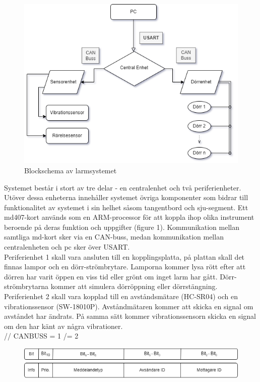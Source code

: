 \documentclass{article}
\begin{document}
\begin{figure}[h]
    \centering
    \includegraphics[scale=0.8]{Projektrapport/diagram.png}
    \caption {Blockschema av larmsystemet}
    \label{fig:drawing}
\end{figure}

Systemet består i stort av tre delar - en centralenhet och två periferienheter. 
Utöver dessa enheterna innehåller systemet övriga komponenter som bidrar till funktionalitet av systemet i sin helhet såsom tangentbord och sju-segment. Ett md407-kort används som en ARM-processor för att koppla ihop olika instrument beroende på deras funktion och uppgifter (figure 1).
Kommunikation mellan samtliga md-kort sker via en CAN-buss, medan kommunikation mellan centralenheten och pc sker över USART. \\

Periferienhet 1 skall vara ansluten till en kopplingsplatta, på plattan skall det finnas lampor och en dörr-strömbrytare. 
Lamporna kommer lysa rött efter att dörren har varit öppen en viss tid eller grönt om inget larm har gått. 
Dörr-strömbrytarna kommer att simulera dörröppning eller dörrstängning. \\

Periferienhet 2 skall vara kopplad till en avståndsmätare (HC-SR04) och en vibrationssensor (SW-18010P). 
Avståndmätaren kommer att skicka en signal om avståndet har ändrats. 
På samma sätt kommer vibrationssensorn skicka en signal om den har känt av några vibrationer. \\

// CANBUSS = 1 /= 2 
\begin{figure}[h]
    \centering
    \includegraphics[scale=0.5]{Projektrapport/protokoll.png}
\end{figure}
\end{document}
